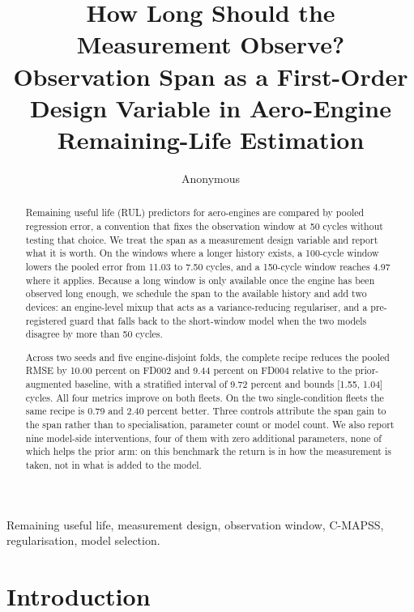 \documentclass[journal]{IEEEtran}
\begin{document}
\title{How Long Should the Measurement Observe? Observation Span as a First-Order Design Variable in Aero-Engine Remaining-Life Estimation}

\author{Anonymous}

\maketitle

\begin{abstract}
Remaining useful life (RUL) predictors for aero-engines are compared by pooled regression error, a convention that fixes the observation window at 50 cycles without testing that choice. We treat the span as a measurement design variable and report what it is worth. On the windows where a longer history exists, a 100-cycle window lowers the pooled error from 11.03 to 7.50 cycles, and a 150-cycle window reaches 4.97 where it applies. Because a long window is only available once the engine has been observed long enough, we schedule the span to the available history and add two devices: an engine-level mixup that acts as a variance-reducing regulariser, and a pre-registered guard that falls back to the short-window model when the two models disagree by more than 50 cycles.

Across two seeds and five engine-disjoint folds, the complete recipe reduces the pooled RMSE by 10.00 percent on FD002 and 9.44 percent on FD004 relative to the prior-augmented baseline, with a stratified interval of 9.72 percent and bounds [1.55, 1.04] cycles. All four metrics improve on both fleets. On the two single-condition fleets the same recipe is 0.79 and 2.40 percent better. Three controls attribute the span gain to the span rather than to specialisation, parameter count or model count. We also report nine model-side interventions, four of them with zero additional parameters, none of which helps the prior arm: on this benchmark the return is in how the measurement is taken, not in what is added to the model.

\end{abstract}

\begin{IEEEkeywords}
Remaining useful life, measurement design, observation window, C-MAPSS, regularisation, model selection.
\end{IEEEkeywords}

\section{Introduction}
\end{document}
